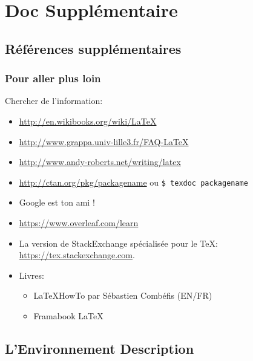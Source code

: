 \section{Doc Supplémentaire}

\subsection{Références supplémentaires}

\begin{frame}
  \frametitle{Pour aller plus loin}
  Chercher de l'information:
    \begin{itemize}
        \item \url{http://en.wikibooks.org/wiki/LaTeX}
        \item \url{http://www.grappa.univ-lille3.fr/FAQ-LaTeX}
            \item \url{http://www.andy-roberts.net/writing/latex}
            \item \url{http://ctan.org/pkg/packagename} ou \lstinline[language=sh,morekeywords={texdoc}]{$ texdoc packagename}
        \item Google est ton ami !
            \item \url{https://www.overleaf.com/learn}
            \item La version de StackExchange spécialisée pour le \TeX:
  \url{https://tex.stackexchange.com}.
        \item Livres:
        \begin{itemize}
            \item \LaTeX HowTo par Sébastien Combéfis (EN/FR)
            \item Framabook \LaTeX
        \end{itemize}
    \end{itemize}
\end{frame}

\subsection{L'Environnement Description}


